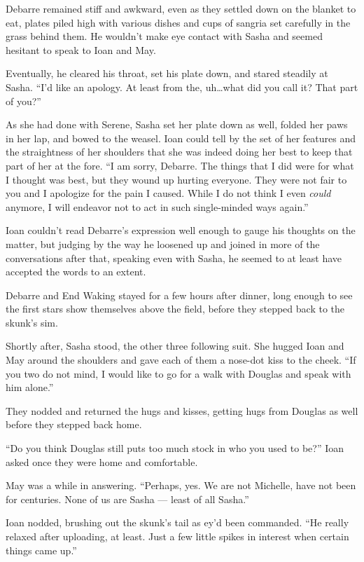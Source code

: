 Debarre remained stiff and awkward, even as they settled down on the blanket to eat, plates piled high with various dishes and cups of sangria set carefully in the grass behind them. He wouldn't make eye contact with Sasha and seemed hesitant to speak to Ioan and May.

Eventually, he cleared his throat, set his plate down, and stared steadily at Sasha. ``I'd like an apology. At least from the, uh\ldots what did you call it? That part of you?''

As she had done with Serene, Sasha set her plate down as well, folded her paws in her lap, and bowed to the weasel. Ioan could tell by the set of her features and the straightness of her shoulders that she was indeed doing her best to keep that part of her at the fore. ``I am sorry, Debarre. The things that I did were for what I thought was best, but they wound up hurting everyone. They were not fair to you and I apologize for the pain I caused. While I do not think I even \emph{could} anymore, I will endeavor not to act in such single-minded ways again.''

Ioan couldn't read Debarre's expression well enough to gauge his thoughts on the matter, but judging by the way he loosened up and joined in more of the conversations after that, speaking even with Sasha, he seemed to at least have accepted the words to an extent.

Debarre and End Waking stayed for a few hours after dinner, long enough to see the first stars show themselves above the field, before they stepped back to the skunk's sim.

Shortly after, Sasha stood, the other three following suit. She hugged Ioan and May around the shoulders and gave each of them a nose-dot kiss to the cheek. ``If you two do not mind, I would like to go for a walk with Douglas and speak with him alone.''

They nodded and returned the hugs and kisses, getting hugs from Douglas as well before they stepped back home.

``Do you think Douglas still puts too much stock in who you used to be?'' Ioan asked once they were home and comfortable.

May was a while in answering. ``Perhaps, yes. We are not Michelle, have not been for centuries. None of us are Sasha — least of all Sasha.''

Ioan nodded, brushing out the skunk's tail as ey'd been commanded. ``He really relaxed after uploading, at least. Just a few little spikes in interest when certain things came up.''

